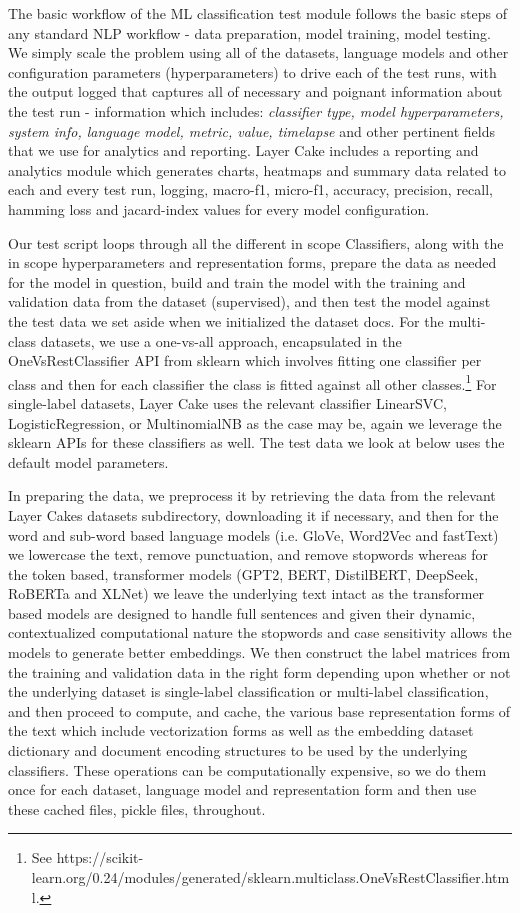 \documentclass[final]{clv2025}
\begin{document}
The basic workflow of the ML classification test module follows the basic steps of any standard NLP workflow - data preparation, model training, model testing. We simply scale the problem using all of the datasets, language models and other configuration parameters (hyperparameters) to drive each of the test runs, with the output logged that captures all of necessary and poignant information about the test run - information which includes: \textit{classifier type, model hyperparameters, system info, language model, metric, value, timelapse} and other pertinent fields that we use for analytics and reporting. Layer Cake includes a reporting and analytics module which generates charts, heatmaps and summary data related to each and every test run, logging, macro-f1, micro-f1, accuracy, precision, recall, hamming loss and jacard-index values for every model configuration. 

Our test script loops through all the different in scope Classifiers, along with the in scope hyperparameters and representation forms, prepare the data as needed for the model in question, build and train the model with the training and validation data from the dataset (supervised), and then test the model against the test data we set aside when we initialized the dataset docs. For the multi-class datasets, we use a one-vs-all approach, encapsulated in the OneVsRestClassifier API from sklearn which involves fitting one classifier per class and then for each classifier the class is fitted against all other classes.\footnote{See https://scikit-learn.org/0.24/modules/generated/sklearn.multiclass.OneVsRestClassifier.html.}  For single-label datasets, Layer Cake uses the relevant classifier LinearSVC, LogisticRegression, or MultinomialNB as the case may be, again we leverage the sklearn APIs for these classifiers as well. The test data we look at below uses the default model parameters.

In preparing the data, we preprocess it by retrieving the data from the relevant Layer Cakes datasets subdirectory, downloading it if necessary, and then for the word and sub-word based language models (i.e. GloVe, Word2Vec and fastText) we lowercase the text, remove punctuation, and remove stopwords whereas for the token based, transformer models (GPT2, BERT, DistilBERT, DeepSeek, RoBERTa and XLNet) we leave the underlying text intact as the transformer based models are designed to handle full sentences and given their dynamic, contextualized computational nature the stopwords and case sensitivity allows the models to generate better embeddings. We then construct the label matrices from the training and validation data in the right form depending upon whether or not the underlying dataset is single-label classification or multi-label classification, and then proceed to compute, and cache, the various base representation forms of the text which include vectorization forms as well as the embedding dataset dictionary and document encoding structures to be used by the underlying classifiers. These operations can be computationally expensive, so we do them once for each dataset, language model and representation form and then use these cached files, pickle files, throughout. 
\end{document}
